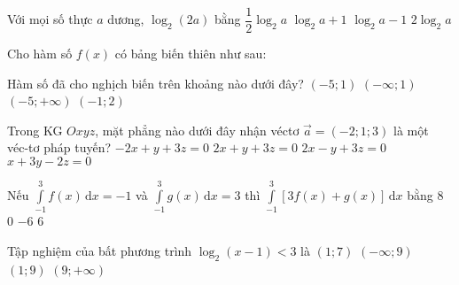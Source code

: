 \begin{ex}%
	Với mọi số thực $a$ dương, $\log _2(2a)$ bằng
	\choice 
	{$\dfrac{1}{2} \log _2 a$}
	{\True $\log _2 a+1$}
	{$\log _2 a-1$}
	{$2 \log _2 a$}
\end{ex}

\begin{ex}%
	Cho hàm số $f(x)$ có bảng biến thiên như sau:
	\begin{center}
	\end{center}
	Hàm số đã cho nghịch biến trên khoảng nào dưới đây?
	\choice 
	{$(-5 ; 1)$}
	{$(-\infty ; 1)$}
	{$(-5 ;+\infty)$}
	{\True $(-1 ; 2)$}
\end{ex}
\begin{ex}%
	Trong KG $Oxyz$, mặt phẳng nào dưới đây nhận véctơ $\overrightarrow{a}=(-2 ; 1 ; 3)$ là một véc-tơ pháp tuyến?
	\choice 
	{\True $-2x+y+3z=0$}
	{$2x+y+3z=0$}
	{$2x-y+3z=0$}
	{$x+3y-2z=0$}
\end{ex}


\begin{ex}%
	Nếu $\displaystyle\int\limits_{-1}^{3} f(x) \mathrm{\,d}x=-1$ và $\displaystyle\int\limits_{-1}^{3} g(x) \mathrm{\,d}x=3$
	thì $\displaystyle\int\limits_{-1}^3 \left[ 3f(x)+g(x)\right] \mathrm{\,d}x$ bằng
	\choice
	{$8$}
	{\True $0$}
	{$-6$}
	{$6$}
\end{ex}

\begin{ex}%
	Tập nghiệm của bất phương trình $\log_{2}\left(x-1\right)<3$ là
	\choice
	{$\left(1;7\right)$}
	{$\left(-\infty;9\right)$}
	{\True $\left(1;9\right)$}
	{$\left(9;+\infty\right)$}
\end{ex}


